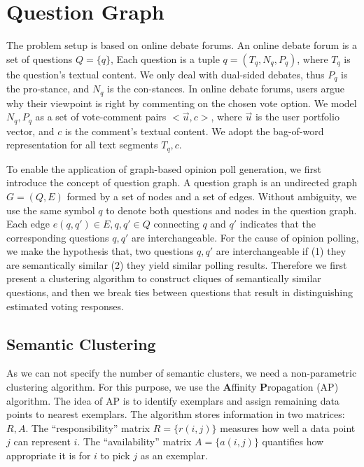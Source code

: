 \documentclass{llncs}
\begin{document}
\section{Question Graph}\label{sec:QG}

The problem setup is based on online debate forums. An online debate forum is a set of questions $Q=\{q\}$, Each question is a tuple $q=(T_q,N_q,P_q)$, where $T_q$ is the question's textual content. We only deal with dual-sided debates, thus $P_q$ is the pro-stance, and $N_q$ is the con-stances. In online debate forums, users argue why their viewpoint is right by commenting on the chosen vote option. We model $N_q,P_q$ as a set of vote-comment pairs $<\vec{u},c>$, where $\vec{u}$ is the user portfolio vector, and $c$ is the comment's textual content. We adopt the bag-of-word representation for all text segments $T_q,c$.



To enable the application of graph-based opinion poll generation, we first introduce the concept of question graph. A question graph is an undirected graph $G=(Q,E)$ formed by a set of nodes and a set of edges. Without ambiguity, we use the same symbol $q$ to denote both questions and nodes in the question graph. Each edge $e(q,q')\in E, q,q'\in Q$ connecting $q$ and $q'$ indicates that the corresponding questions $q,q'$ are interchangeable. For the cause of opinion polling, we make the hypothesis that, two questions $q,q'$ are interchangeable if (1) they are semantically similar (2) they yield similar polling results. Therefore we first present a clustering algorithm to construct cliques of semantically similar questions, and then we break ties between questions that result in distinguishing estimated voting responses.



\subsection{Semantic Clustering}\label{sec:clustering}



As we can not specify the number of semantic clusters, we need a non-parametric clustering algorithm. For this purpose, we use the \textbf{A}ffinity \textbf{P}ropagation (AP) algorithm. The idea of AP is to identify exemplars and assign remaining data points to nearest exemplars. The algorithm stores information in two matrices: $R,A$. The ``responsibility'' matrix $R=\{r(i, j)\}$ measures how well a data point $j$ can represent $i$. The ``availability'' matrix $A=\{a(i,j)\}$ quantifies how appropriate it is for $i$ to pick $j$ as an exemplar.
\end{document}
